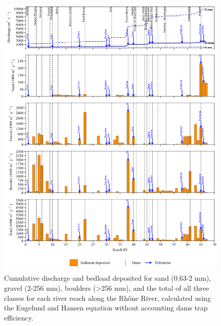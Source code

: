 \documentclass[
]{book}
\begin{document}
\begin{figure}
\includegraphics[width=26.24in]{img/res_cascade/res_E0_eE&H_noDams/plots_dep-silt/dep_res_sum_hy_E0_eE&H_noDams} \caption{Cumulative discharge and bedload deposited for sand (0.63-2 mm), gravel (2-256 mm), boulders (>256 mm), and the total of all three classes for each river reach along the Rhône River, calculated using the Eugelund and Hansen equation without accounting dams trap efficiency.}\label{fig:DepE0eE}
\end{figure}
\end{document}
